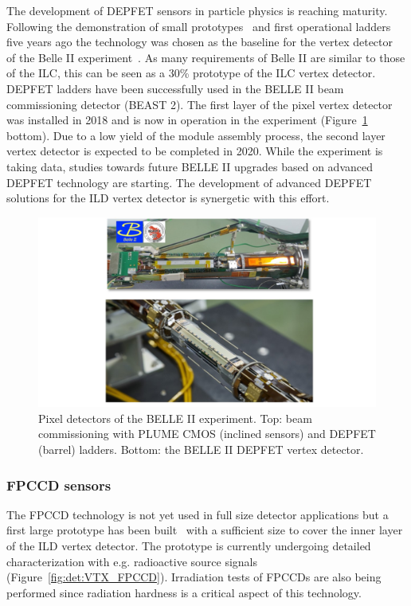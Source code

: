 The development of DEPFET sensors in particle physics is reaching maturity. Following the demonstration of small
prototypes~\cite{Andricek:2011zza,Velthuis:2008zza} and first operational ladders five years ago the technology was 
chosen as the baseline for the vertex detector~\cite{Marinas:2011zz} of the Belle II experiment~\cite{Abe:2010gxa}. 
As many requirements of Belle II are similar to those
of the ILC, this can be seen as a 30\% prototype of the ILC vertex detector. DEPFET ladders have been successfully used 
in the BELLE II beam commissioning detector (BEAST 2). The first layer of the pixel vertex detector was installed in 2018
and is now in operation in the experiment (Figure~\ref{fig:det:VTX_BELLE2} bottom). Due to a low yield of the module assembly 
process, the second layer vertex detector is expected to be completed in 2020. While the experiment is 
taking data, studies towards future BELLE II upgrades based on advanced DEPFET technology are starting. The development of advanced DEPFET solutions for the ILD vertex detector is synergetic with this effort.

\begin{figure}[t!]
\centering
\includegraphics[width=1.0\hsize]{Detector/fig/VTX_BELLE2.jpg}
\caption{Pixel detectors of the BELLE II experiment. Top: beam commissioning with PLUME CMOS (inclined sensors) and DEPFET (barrel) ladders. Bottom: the BELLE II DEPFET vertex detector.}
\label{fig:det:VTX_BELLE2}
\end{figure}

\subsubsection{FPCCD sensors}

The FPCCD technology is not yet used in full size detector applications but a first large prototype has been built~\cite{ild:bib:FPCCD} with a sufficient size to cover the inner layer of the ILD vertex detector. The prototype is currently undergoing detailed characterization with e.g. radioactive source signals (Figure~\ref{fig:det:VTX_FPCCD}). Irradiation tests of FPCCDs are also being performed since radiation hardness is a critical aspect of this technology.   

